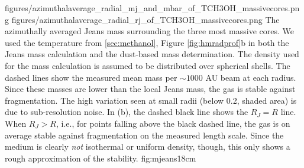 \documentclass{emulateapj}
\begin{document}


\FigureTwo
{figures/azimuthalaverage_radial_mj_and_mbar_of_TCH3OH_massivecores.png}
{figures/azimuthalaverage_radial_rj_of_TCH3OH_massivecores.png}
{The azimuthally averaged Jeans mass surrounding the
three most massive cores.  We used the \methanol temperature from
\ref{sec:methanol}, Figure \ref{fig:hmradprof}b in both the Jeans mass
calculation and the dust-based mass determination.
The density used for the mass calculation is assumed to be distributed
over spherical shells.  The dashed lines show the measured mean mass per
$\sim1000$ AU beam at each radius.  Since these masses are lower than
the local Jeans mass, the gas is stable against fragmentation.
The high variation seen at small radii (below 0.2\arcsec, shaded area) is due
to sub-resolution noise.
In (b), the dashed black line shows the $R_J=R$ line.  When $R_J > R$, i.e.,
for points falling above the black dashed line,
the gas is on average stable against fragmentation on the measured length
scale.  Since the medium is clearly \emph{not} isothermal or uniform density,
though, this only shows a rough approximation of the stability.
}
{fig:mjeans}{1}{8cm}
\end{document}

